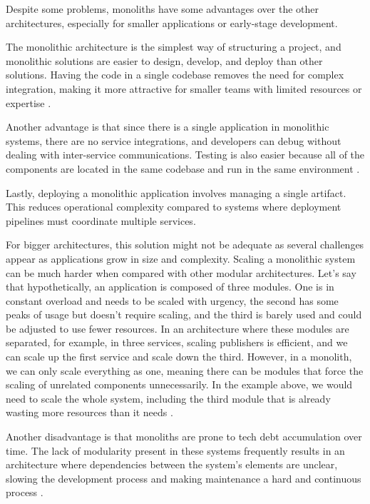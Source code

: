 Despite some problems, monoliths have some advantages over the other architectures,
especially for smaller applications or early-stage development.

The monolithic architecture is the simplest way of structuring a
project, and monolithic solutions are easier to design, develop, and deploy
than other solutions.
Having the code in a single codebase removes the need for complex
integration, making it more attractive for smaller teams with limited
resources or expertise \cite{IBMMonolith}.

Another advantage is that since there is a single application in monolithic
systems, there are no service integrations, and developers can debug without
dealing with inter-service communications. Testing is also easier because all
of the components are located in the same codebase and run in the same
environment \cite{newman2019monolith}.

Lastly, deploying a monolithic application involves managing a single artifact. This
reduces operational complexity compared to systems where deployment
pipelines must coordinate multiple services.

For bigger architectures, this solution might not be adequate as several
challenges appear as applications grow in size and complexity.
Scaling a monolithic system can be much harder when
compared with other modular architectures. Let's say that hypothetically,
an application is composed of three modules. One is in constant
overload and needs to be scaled with urgency, the second has some peaks of
usage but doesn't require scaling, and the third is barely used and
could be adjusted to use fewer resources. In an architecture where these
modules are separated, for example, in three services, scaling publishers is
efficient, and we can scale up the first service and scale down the third.
However, in a monolith, we can only scale everything as one, meaning there
can be modules that force the scaling of unrelated components unnecessarily.
In the example above, we would need to scale the whole system, including
the third module that is already wasting more resources than it needs \cite{7333476}.

Another disadvantage is that monoliths are prone to tech debt accumulation over
time. The lack of modularity present in these systems frequently results in
an architecture where dependencies between the system's elements are unclear,
slowing the development process and making maintenance a hard and continuous
process \cite{7333476}.


